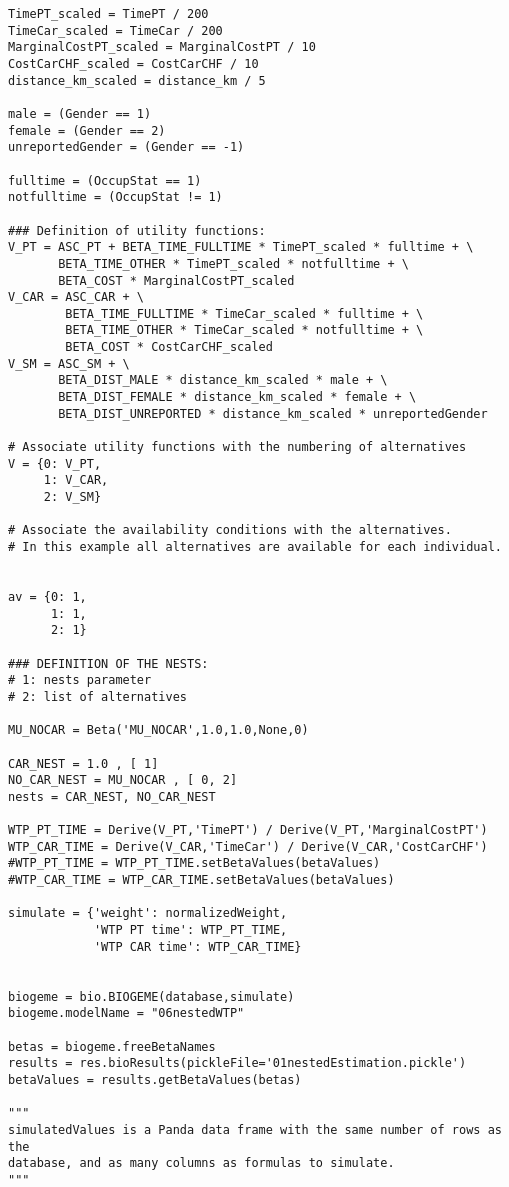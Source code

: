 \documentclass[12pt,a4paper]{article}
\begin{document}
\begin{lstlisting}[style=numbers]
TimePT_scaled = TimePT / 200
TimeCar_scaled = TimeCar / 200
MarginalCostPT_scaled = MarginalCostPT / 10
CostCarCHF_scaled = CostCarCHF / 10
distance_km_scaled = distance_km / 5

male = (Gender == 1)
female = (Gender == 2)
unreportedGender = (Gender == -1)

fulltime = (OccupStat == 1)
notfulltime = (OccupStat != 1)

### Definition of utility functions:
V_PT = ASC_PT + BETA_TIME_FULLTIME * TimePT_scaled * fulltime + \
       BETA_TIME_OTHER * TimePT_scaled * notfulltime + \
       BETA_COST * MarginalCostPT_scaled
V_CAR = ASC_CAR + \
        BETA_TIME_FULLTIME * TimeCar_scaled * fulltime + \
        BETA_TIME_OTHER * TimeCar_scaled * notfulltime + \
        BETA_COST * CostCarCHF_scaled
V_SM = ASC_SM + \
       BETA_DIST_MALE * distance_km_scaled * male + \
       BETA_DIST_FEMALE * distance_km_scaled * female + \
       BETA_DIST_UNREPORTED * distance_km_scaled * unreportedGender

# Associate utility functions with the numbering of alternatives
V = {0: V_PT,
     1: V_CAR,
     2: V_SM}

# Associate the availability conditions with the alternatives.
# In this example all alternatives are available for each individual.


av = {0: 1,
      1: 1,
      2: 1}

### DEFINITION OF THE NESTS:
# 1: nests parameter
# 2: list of alternatives

MU_NOCAR = Beta('MU_NOCAR',1.0,1.0,None,0)

CAR_NEST = 1.0 , [ 1]
NO_CAR_NEST = MU_NOCAR , [ 0, 2]
nests = CAR_NEST, NO_CAR_NEST

WTP_PT_TIME = Derive(V_PT,'TimePT') / Derive(V_PT,'MarginalCostPT')
WTP_CAR_TIME = Derive(V_CAR,'TimeCar') / Derive(V_CAR,'CostCarCHF')
#WTP_PT_TIME = WTP_PT_TIME.setBetaValues(betaValues)
#WTP_CAR_TIME = WTP_CAR_TIME.setBetaValues(betaValues)

simulate = {'weight': normalizedWeight,
            'WTP PT time': WTP_PT_TIME,
            'WTP CAR time': WTP_CAR_TIME}


biogeme = bio.BIOGEME(database,simulate)
biogeme.modelName = "06nestedWTP"

betas = biogeme.freeBetaNames
results = res.bioResults(pickleFile='01nestedEstimation.pickle')
betaValues = results.getBetaValues(betas)

"""
simulatedValues is a Panda data frame with the same number of rows as the
database, and as many columns as formulas to simulate.
"""


\end{lstlisting}
\end{document}
